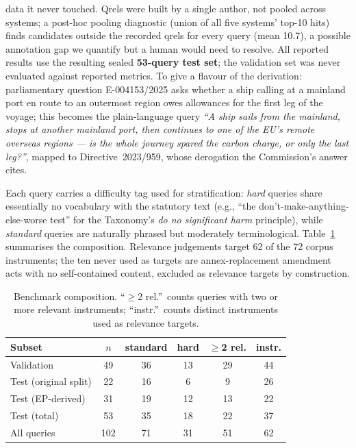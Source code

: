 \documentclass[conference,a4paper]{IEEEtran}
\begin{document}
data it never touched.
Qrels were built by a single author, not pooled across systems; a
post-hoc pooling diagnostic (union of all five systems' top-10 hits)
finds candidates outside the recorded qrels for every query (mean
10.7), a possible annotation gap we quantify but a human would need
to resolve.
All reported results use the resulting sealed \textbf{53-query test
set}; the validation set was never evaluated against reported metrics.
To give a flavour of the derivation: parliamentary question
E-004153/2025 asks whether a ship calling at a mainland port en route
to an outermost region owes allowances for the first leg of the
voyage; this becomes the plain-language query \emph{``A ship sails
from the mainland, stops at another mainland port, then continues to
one of the EU's remote overseas regions --- is the whole journey
spared the carbon charge, or only the last leg?''}, mapped to
Directive~2023/959, whose derogation the Commission's answer cites.

Each query carries a difficulty tag used for stratification:
\emph{hard} queries share essentially no vocabulary with the statutory
text (e.g., ``the don't-make-anything-else-worse test'' for the
Taxonomy's \emph{do no significant harm} principle), while
\emph{standard} queries are naturally phrased but moderately
terminological.
Table~\ref{tab:benchmark} summarises the composition.
Relevance judgements target 62 of the 72 corpus instruments; the ten
never used as targets are annex-replacement amendment acts with no
self-contained content, excluded as relevance targets by
construction.

\begin{table}[!t]
\renewcommand{\arraystretch}{1.3}
\caption{Benchmark composition. ``$\geq$2 rel.''\ counts queries with
  two or more relevant instruments; ``instr.''\ counts distinct
  instruments used as relevance targets.}
\label{tab:benchmark}
\centering
\small
\begin{tabular}{@{}lccccc@{}}
\toprule
Subset & $n$ & standard & hard & $\geq$2 rel. & instr. \\
\midrule
Validation            &  49 & 36 & 13 & 29 & 44 \\
Test (original split) &  22 & 16 &  6 &  9 & 26 \\
Test (EP-derived)     &  31 & 19 & 12 & 13 & 22 \\
\midrule
Test (total)          &  53 & 35 & 18 & 22 & 37 \\
All queries           & 102 & 71 & 31 & 51 & 62 \\
\bottomrule
\end{tabular}
\end{table}
\end{document}
